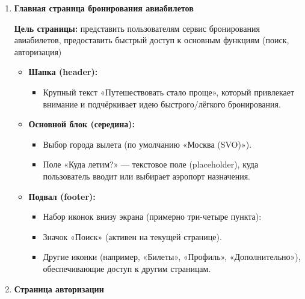 \begin{enumerate}
    \item \textbf{Главная страница бронирования авиабилетов}

        \textbf{Цель страницы:} представить пользователям сервис бронирования авиабилетов, предоставить быстрый доступ к основным функциям (поиск, авторизация)
        \begin {itemize}
            \item \textbf{Шапка (header):}
            \begin{itemize}
                \item Крупный текст «Путешествовать стало проще», который привлекает внимание и подчёркивает идею быстрого/лёгкого бронирования.
            \end{itemize}
            \item \textbf{Основной блок (середина):}
            \begin{itemize}
                \item Выбор города вылета (по умолчанию «Москва (SVO)»).
                \item Поле «Куда летим?» — текстовое поле (placeholder), куда пользователь вводит или выбирает аэропорт назначения.
            \end{itemize}
            \item \textbf{Подвал (footer):}
            \begin{itemize}
                \item Набор иконок внизу экрана (примерно три-четыре пункта):
                \item Значок «Поиск» (активен на текущей странице).
                \item Другие иконки (например, «Билеты», «Профиль», «Дополнительно»), обеспечивающие доступ к другим страницам.
            \end{itemize}
        \end{itemize}

    \item \textbf{Страница авторизации}


\end{enumerate}
